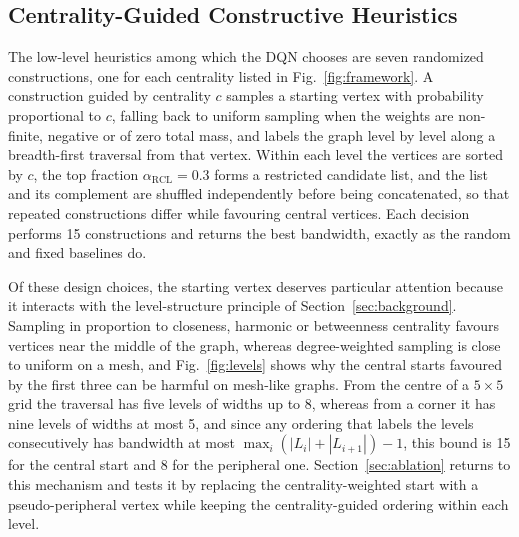 \documentclass[runningheads]{llncs}
\begin{document}
\subsection{Centrality-Guided Constructive Heuristics}
\label{sec:heuristics}

The low-level heuristics among which the DQN chooses are seven randomized constructions, one for each centrality listed in Fig.~\ref{fig:framework}. A construction guided by centrality $c$ samples a starting vertex with probability proportional to $c$, falling back to uniform sampling when the weights are non-finite, negative or of zero total mass, and labels the graph level by level along a breadth-first traversal from that vertex. Within each level the vertices are sorted by $c$, the top fraction $\alpha_{\mathrm{RCL}}=0.3$ forms a restricted candidate list, and the list and its complement are shuffled independently before being concatenated, so that repeated constructions differ while favouring central vertices. Each decision performs 15 constructions and returns the best bandwidth, exactly as the random and fixed baselines do.

Of these design choices, the starting vertex deserves particular attention because it interacts with the level-structure principle of Section~\ref{sec:background}. Sampling in proportion to closeness, harmonic or betweenness centrality favours vertices near the middle of the graph, whereas degree-weighted sampling is close to uniform on a mesh, and Fig.~\ref{fig:levels} shows why the central starts favoured by the first three can be harmful on mesh-like graphs. From the centre of a $5\times5$ grid the traversal has five levels of widths up to 8, whereas from a corner it has nine levels of widths at most 5, and since any ordering that labels the levels consecutively has bandwidth at most $\max_i(|L_i|+|L_{i+1}|)-1$, this bound is 15 for the central start and 8 for the peripheral one. Section~\ref{sec:ablation} returns to this mechanism and tests it by replacing the centrality-weighted start with a pseudo-peripheral vertex while keeping the centrality-guided ordering within each level.
\end{document}
